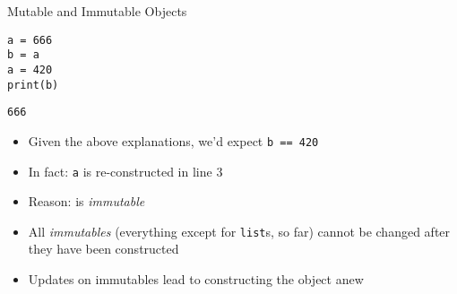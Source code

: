 \begin{frame}[fragile]{Mutable and Immutable Objects}
%
\begin{tcbraster}[raster columns=2,
                  raster equal height,
                  nobeforeafter,
                  raster column skip=0.5cm]
\begin{codebox}
\begin{verbatim}
a = 666
b = a
a = 420
print(b)
\end{verbatim}
\end{codebox}
%
\begin{cmdbox}
\begin{verbatim}
666
\end{verbatim}
\end{cmdbox}
\end{tcbraster}
%
\begin{itemize}
\item Given the above explanations, we'd expect \texttt{b == 420}
\item In fact: \texttt{a} is re-constructed in line 3
\item Reason:  is \emph{immutable}
\item All \emph{immutables} (\ie everything except for \texttt{list}s, so far) cannot be changed after they have been constructed
\item Updates on immutables lead to constructing the object anew
\end{itemize}
%
\end{frame}


